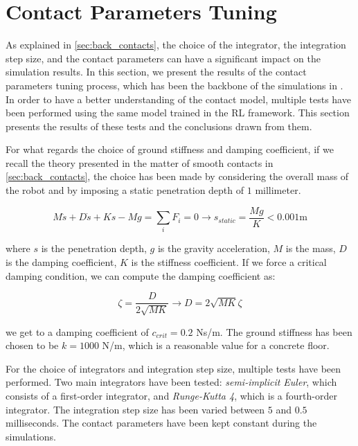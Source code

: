 \chapter{Contact Parameters Tuning}

As explained in \cref{sec:back_contacts}, the choice of the integrator, the integration step size, and the contact parameters can have a significant impact on the simulation results. In this section, we present the results of the contact parameters tuning process, which has been the backbone of the simulations in \jaxsim.
In order to have a better understanding of the contact model, multiple tests have been performed using the same model trained in the \ac{RL} framework. This section presents the results of these tests and the conclusions drawn from them.

For what regards the choice of ground stiffness and damping coefficient, if we recall the theory presented in the matter of smooth contacts in \cref{sec:back_contacts}, the choice has been made by considering the overall mass of the robot and by imposing a static penetration depth of $1$ millimeter.

\begin{equation}
    M\ddot{s} + D\dot{s} + Ks - Mg = \sum _i F _i = 0 \rightarrow s _{static} = \frac{Mg}{K} < 0.001 \text{m}
\end{equation}

where $s$ is the penetration depth, $g$ is the gravity acceleration, $M$ is the mass, $D$ is the damping coefficient, $K$ is the stiffness coefficient.
If we force a critical damping condition, we can compute the damping coefficient as:

\begin{equation}
    \zeta = \frac{D}{2\sqrt{MK}} \rightarrow D = 2\sqrt{MK}\zeta
\end{equation}

we get to a damping coefficient of $c_{crit} = 0.2$ Ns/m. The ground stiffness has been chosen to be $k = 1000$ N/m, which is a reasonable value for a concrete floor.

For the choice of integrators and integration step size, multiple tests have been performed. Two main integrators have been tested: \textit{semi-implicit Euler}, which consists of a first-order integrator, and \textit{Runge-Kutta 4}, which is a fourth-order integrator. The integration step size has been varied between $5$ and $0.5$ milliseconds. The contact parameters have been kept constant during the simulations.

